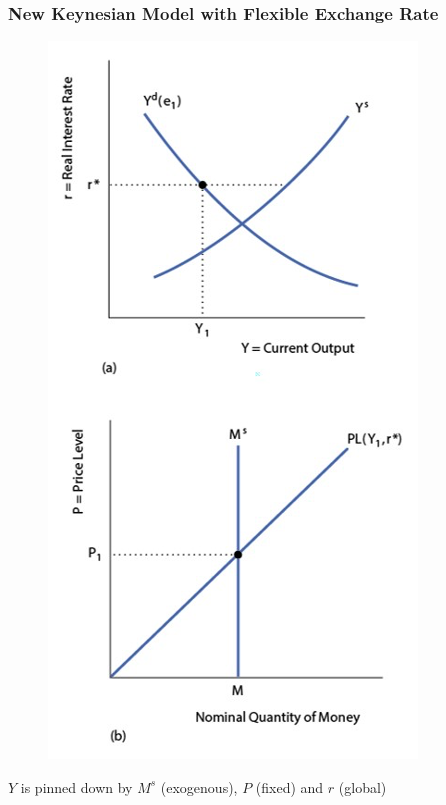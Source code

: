 \documentclass{beamer}
\begin{document}
\begin{frame}
\frametitle[alignment=center]{New Keynesian Model with Flexible Exchange Rate}
\begin{figure}
\centering
\includegraphics[scale=0.55]{Figures/W_Fig_17pt13.png}
\end{figure}
$Y$ is pinned down by $M^s$ (exogenous), $P$ (fixed) and $r$ (global)
\end{frame}
\end{document}
